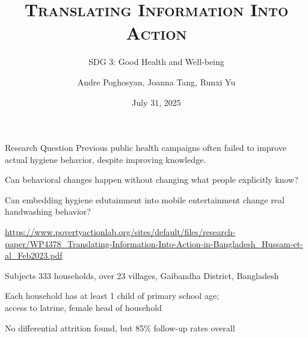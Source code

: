 \documentclass[aspectratio=169]{beamer}
\title{\scshape Translating Information Into Action}
\subtitle{\upshape SDG 3: Good Health and Well-being}
\author{Andre Poghosyan, Joanna Tang, Runxi Yu}
\date{July 31, 2025}
\begin{document}
\maketitle

\begin{frame}{Research Question}
	Previous public health campaigns often failed to improve actual hygiene behavior, despite improving knowledge.

	Can behavioral changes happen without changing what people explicitly know?

	\Large Can embedding hygiene edutainment into mobile entertainment change real handwashing behavior?

	\normalsize

	\bigskip

	\url{https://www.povertyactionlab.org/sites/default/files/research-paper/WP4378_Translating-Information-Into-Action-in-Bangladesh_Hussam-et-al_Feb2023.pdf}
\end{frame}

\begin{frame}{Subjects}
	333 households, over 23 villages, Gaibandha District, Bangladesh

	Each household has at least 1 child of primary school age;\\
	access to latrine, female head of household

	\bigskip

	No differential attrition found, but 85\% follow-up rates overall
\end{frame}
\end{document}
